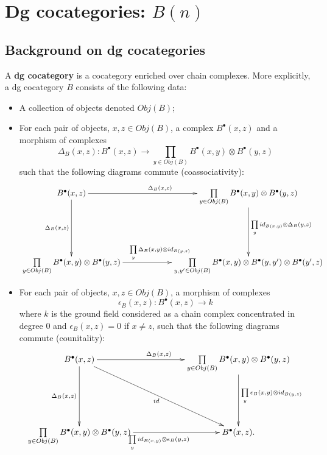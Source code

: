 \section{Dg cocategories: $B(n)$}\label{sec:B(n)}
%
\subsection{Background on dg cocategories}
\begin{defn} A \textbf{dg cocategory} is a 
cocategory enriched over chain complexes. 
More explicitly, a dg cocategory $B$ consists 
of the following data:
\begin{itemize}
\item A collection of objects 
  denoted $Obj(B)$;
\item For each pair of objects, $x,z \in 
  Obj(B)$, a complex $B^\bullet(x,z)$ and 
  a morphism of complexes
  $$
  \Delta_B(x,z): B^\bullet(x,z) \to 
  \prod \limits_{y \in Obj(B)}
  B^\bullet(x,y) \otimes
  B^\bullet(y,z)
  $$
  such that the following diagrams 
  commute (coassociativity):
  $$
  \xymatrixcolsep{5pc}
  \xymatrixrowsep{5pc}
  \xymatrix{
  B^\bullet(x,z)
  \ar[r]^{\Delta_B(x,z)}
  \ar[d]_{\Delta_B(x,z)}
  & \prod \limits_{y \in Obj(B)}
    B^\bullet(x,y) \otimes
    B^\bullet(y,z)
  \ar[d]^{\prod\limits_y 
    id_{B(x,y)} \otimes \Delta_B(y,z)}\\
  \prod \limits_{y \in Obj(B)}
    B^\bullet(x,y) \otimes
    B^\bullet(y,z)
  \ar[r]^{\prod\limits_y 
    \Delta_B(x,y) \otimes id_{B(y,z)}}
  & \prod \limits_{y, y^\prime \in Obj(B)}
    B^\bullet(x,y) \otimes
    B^\bullet(y,y^\prime) \otimes
    B^\bullet(y^\prime,z)  
  }
  $$
\item For each pair of objects, $x,z \in
  Obj(B)$, a morphism of complexes
  $$
  \epsilon_B(x,z): B^\bullet(x,z) \to k
  $$
  where $k$ is the ground field considered 
  as a chain complex concentrated in degree 
  0 and $\epsilon_B(x,z) = 0$ if $x\neq z$, 
  such that the following diagrams commute 
  (counitality):
  $$
  \xymatrixcolsep{5pc}
  \xymatrixrowsep{5pc}
  \xymatrix{
  B^\bullet(x,z)
  \ar[r]^{\Delta_B(x,z)}
  \ar[d]_{\Delta_B(x,z)}
  \ar[rd]_{id}
  & \prod \limits_{y \in Obj(B)} 
    B^\bullet(x,y) \otimes
    B^\bullet(y,z)
  \ar[d]^{\prod \limits_y
    \epsilon_B(x,y)
    \otimes id_{B(y,z)}} \\
  \prod \limits_{y \in Obj(B)} 
    B^\bullet(x,y) \otimes
    B^\bullet(y,z)
  \ar[r]_{\prod \limits_y
    id_{B(x,y)} \otimes 
    \epsilon_B(y,z)}
  & B^\bullet(x,z).  
  }
  $$
\end{itemize}
\end{defn}

